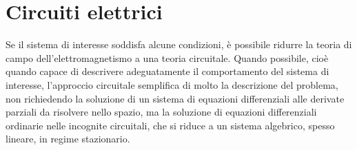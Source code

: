 \documentclass[letterpaper,10pt,english]{jupyterBook}
\begin{document}
\section{Circuiti elettrici}
\label{\detokenize{ch/circuits-electric:circuiti-elettrici}}\label{\detokenize{ch/circuits-electric:classical-electromagnetism-circuits-electric}}\label{\detokenize{ch/circuits-electric::doc}}
\sphinxAtStartPar
Se il sistema di interesse soddisfa alcune condizioni, è possibile ridurre la teoria di campo dell’elettromagnetismo a una teoria circuitale.
Quando possibile, cioè quando capace di descrivere adeguatamente il comportamento del sistema di interesse, l’approccio circuitale semplifica di molto la descrizione del problema, non richiedendo la soluzione di un sistema di equazioni differenziali alle derivate parziali da risolvere nello spazio, ma la soluzione di equazioni differenziali ordinarie nelle incognite circuitali, che si riduce a un sistema algebrico, spesso lineare, in regime stazionario.

\sphinxAtStartPar
{}

\sphinxAtStartPar
{}

\sphinxstepscope
\end{document}
